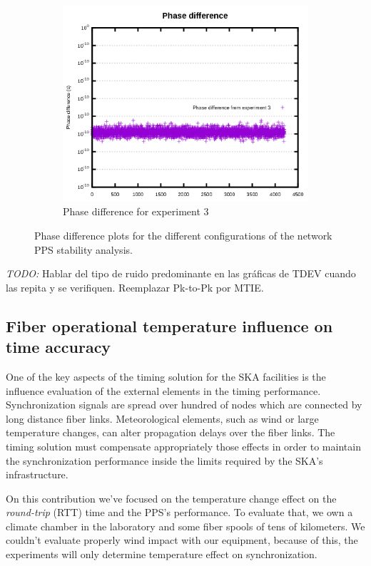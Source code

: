 \begin{figure}[H]
    ~
    \begin{subfigure}[t]{.3\textwidth}
        \centering
        \includegraphics[width=\textwidth]{img/prueba3_pd.png}
        \caption{Phase difference for experiment 3}
        \label{fig:prueba3_pd}
    \end{subfigure}
    \caption{Phase difference plots for the different configurations of the network PPS stability analysis.}
\end{figure}

\textit{TODO:} Hablar del tipo de ruido predominante en las gráficas de TDEV 
cuando las repita y se verifiquen. Reemplazar Pk-to-Pk por MTIE.


\subsection{Fiber operational temperature influence on time accuracy}

One of the key aspects of the timing solution for the SKA facilities is the 
influence evaluation of the external elements in the timing performance. 
Synchronization signals are spread over hundred of nodes which are connected by 
long distance fiber links. Meteorological elements, such as wind or large 
 temperature changes, can alter propagation delays over the fiber 
links. The timing solution must compensate appropriately those effects in order 
to maintain the synchronization performance inside the limits required by the 
SKA's infrastructure.

On this contribution we've focused on the temperature change effect on the 
\textit{round-trip} (RTT) time and the PPS's performance. To evaluate that, we 
own a 
climate chamber in the laboratory and some fiber spools of tens of kilometers. 
We couldn't evaluate properly wind impact with our equipment, because of this, 
the experiments will only determine temperature effect on synchronization.

